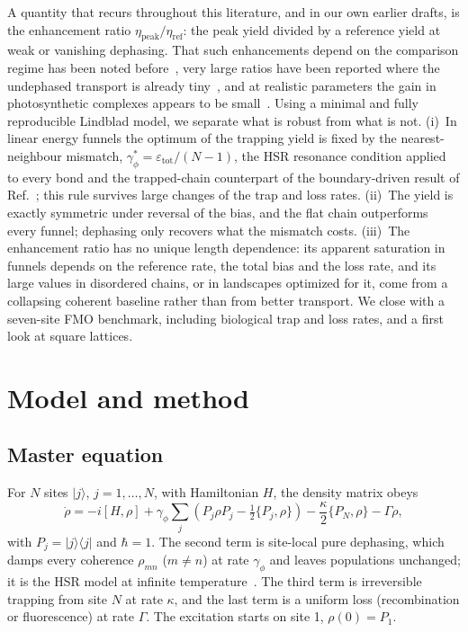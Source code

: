 \documentclass[aps,pre,preprint,floatfix]{revtex4-2}
\newcommand{\gp}{\gamma_\phi}
\newcommand{\gps}{\gamma_\phi^*}
\newcommand{\ket}[1]{|#1\rangle}
\newcommand{\bra}[1]{\langle #1|}
\newcommand{\etap}{\eta_\text{peak}}
\newcommand{\etar}{\eta_\text{ref}}
\newcommand{\enh}{\etap/\etar}
\newcommand{\half}{\tfrac{1}{2}}
\begin{document}
A quantity that recurs throughout this literature, and in our own earlier
drafts, is the enhancement ratio $\enh$: the peak yield divided by a reference
yield at weak or vanishing dephasing.
That such enhancements depend on the comparison regime has been noted
before~\cite{kassal2013}, very large ratios have been reported where the
undephased transport is already tiny~\cite{dwiputra2020}, and at realistic
parameters the gain in photosynthetic complexes appears to be
small~\cite{zerahharush2021}.
Using a minimal and fully reproducible Lindblad model, we separate what is
robust from what is not.
(i)~In linear energy funnels the optimum of the trapping yield is fixed by the
nearest-neighbour mismatch, $\gps=\varepsilon_\text{tot}/(N-1)$, the HSR
resonance condition applied to every bond and the trapped-chain counterpart of
the boundary-driven result of Ref.~\cite{jacob2024}; this rule survives large
changes of the trap and loss rates.
(ii)~The yield is exactly symmetric under reversal of the bias, and the flat
chain outperforms every funnel; dephasing only recovers what the mismatch
costs.
(iii)~The enhancement ratio has no unique length dependence: its apparent
saturation in funnels depends on the reference rate, the total bias and the
loss rate, and its large values in disordered chains, or in landscapes
optimized for it, come from a collapsing coherent baseline rather than from
better transport.
We close with a seven-site FMO benchmark, including biological trap and loss
rates, and a first look at square lattices.

\section{\label{sec:model}Model and method}

\subsection{Master equation}

For $N$ sites $\ket{j}$, $j=1,\ldots,N$, with Hamiltonian $H$, the density
matrix obeys
\begin{equation}
  \dot\rho = -i[H,\rho]
    + \gp\sum_j\!\left(P_j\rho P_j - \half\{P_j,\rho\}\right)
    - \frac{\kappa}{2}\{P_N,\rho\} - \Gamma\rho ,
  \label{eq:lindblad}
\end{equation}
with $P_j=\ket{j}\bra{j}$ and $\hbar=1$.
The second term is site-local pure dephasing, which damps every coherence
$\rho_{mn}$ ($m\neq n$) at rate $\gp$ and leaves populations unchanged; it is
the HSR model at infinite temperature~\cite{haken1972,haken1973}.
The third term is irreversible trapping from site $N$ at rate $\kappa$, and the
last term is a uniform loss (recombination or fluorescence) at rate $\Gamma$.
The excitation starts on site 1, $\rho(0)=P_1$.
\end{document}
